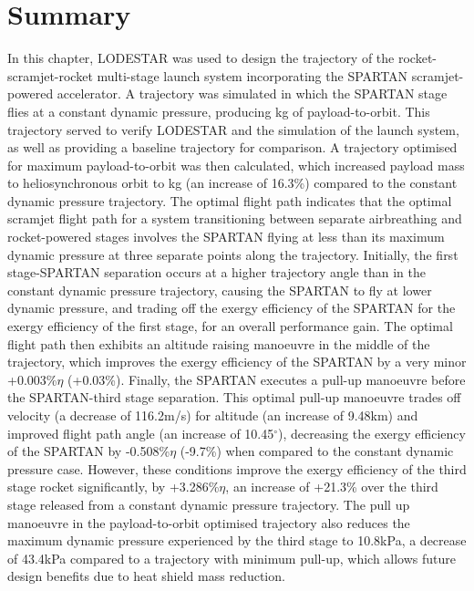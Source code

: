 \section{Summary}


In this chapter, LODESTAR was used to design the trajectory of the rocket-scramjet-rocket multi-stage launch system incorporating the SPARTAN scramjet-powered accelerator. 
A trajectory was simulated in which the SPARTAN stage flies at a constant dynamic pressure, producing \PayloadToOrbitConstqNoReturn kg of payload-to-orbit. This trajectory served to verify LODESTAR and the simulation of  the launch system, as well as providing a baseline trajectory for comparison. 
A trajectory optimised for maximum payload-to-orbit was then calculated, which increased payload mass to heliosynchronous orbit to \PayloadToOrbitStandard kg (an increase of 16.3\%) compared to the constant dynamic pressure trajectory.
  The optimal flight path indicates that the optimal scramjet flight path for a system transitioning between separate airbreathing and rocket-powered stages involves the SPARTAN flying at less than its maximum dynamic pressure at three separate points along the trajectory. 
  Initially, the first stage-SPARTAN separation occurs at a higher trajectory angle than in the constant dynamic pressure trajectory, causing the SPARTAN to fly at lower dynamic pressure, and trading off the exergy efficiency of the SPARTAN for the exergy efficiency of the first stage, for an overall performance gain. 
  The optimal flight path then exhibits an altitude raising manoeuvre in the middle of the trajectory, which improves the exergy efficiency of the SPARTAN by a very minor +0.003\%$\eta$ (+0.03\%). 
  Finally, the SPARTAN executes a pull-up manoeuvre before the SPARTAN-third stage separation. This optimal pull-up manoeuvre trades off velocity (a decrease of 116.2m/s) for altitude (an increase of 9.48km) and improved flight path angle (an increase of 10.45$^\circ$), decreasing the exergy efficiency of the SPARTAN by -0.508\%$\eta$ (-9.7\%) when compared to the constant dynamic pressure case. 
  However, these conditions improve the exergy efficiency of the third stage rocket significantly, by +3.286\%$\eta$, an increase of +21.3\% over the third stage released from a constant dynamic pressure trajectory. 
 The pull up manoeuvre in the payload-to-orbit optimised trajectory also reduces the maximum dynamic pressure experienced by the third stage to 10.8kPa, a decrease of 43.4kPa compared to a trajectory with minimum pull-up, which allows future design benefits due to heat shield mass reduction.  

